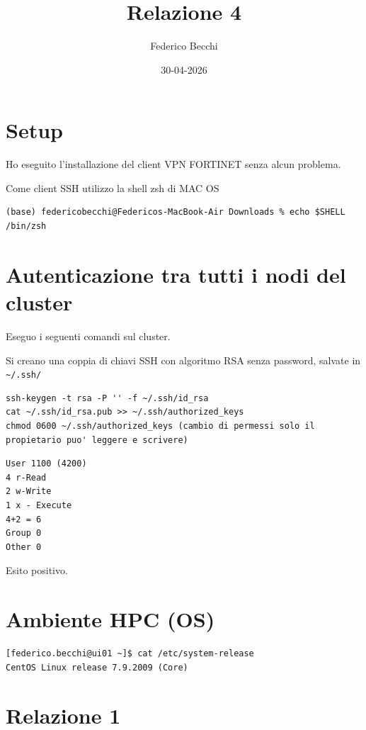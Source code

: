 \documentclass[11pt,a4paper]{article}
\title{Relazione 4}
\author{Federico Becchi}
\date{30-04-2026}
\begin{document}
\maketitle

\section{Setup}

Ho eseguito l'installazione del client VPN FORTINET senza alcun problema.

Come client SSH utilizzo la shell zsh di MAC OS

\begin{lstlisting}
(base) federicobecchi@Federicos-MacBook-Air Downloads % echo $SHELL
/bin/zsh
\end{lstlisting}

\section{Autenticazione tra tutti i nodi del cluster}

Eseguo i seguenti comandi sul cluster.

Si creano una coppia di chiavi SSH con algoritmo RSA senza password, salvate in \texttt{\~{}/.ssh/}

\begin{lstlisting}
ssh-keygen -t rsa -P '' -f ~/.ssh/id_rsa
cat ~/.ssh/id_rsa.pub >> ~/.ssh/authorized_keys
chmod 0600 ~/.ssh/authorized_keys (cambio di permessi solo il propietario puo' leggere e scrivere)
\end{lstlisting}

\begin{lstlisting}
User 1100 (4200)
4 r-Read
2 w-Write
1 x - Execute
4+2 = 6
Group 0
Other 0
\end{lstlisting}

Esito positivo.

\section{Ambiente HPC (OS)}

\begin{lstlisting}
[federico.becchi@ui01 ~]$ cat /etc/system-release
CentOS Linux release 7.9.2009 (Core)
\end{lstlisting}

\section{Relazione 1}
\end{document}
